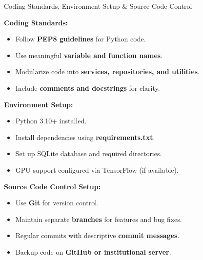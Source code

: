 \documentclass[10pt]{beamer}
\begin{document}
\begin{frame}{Coding Standards, Environment Setup \& Source Code Control}

\textbf{Coding Standards:}
\begin{itemize}
    \item Follow \textbf{PEP8 guidelines} for Python code.
    \item Use meaningful \textbf{variable and function names}.
    \item Modularize code into \textbf{services, repositories, and utilities}.
    \item Include \textbf{comments and docstrings} for clarity.
\end{itemize}

\vspace{0.3cm}

\textbf{Environment Setup:}
\begin{itemize}
    \item Python 3.10+ installed.
    \item Install dependencies using \textbf{requirements.txt}.
    \item Set up SQLite database and required directories.
    \item GPU support configured via TensorFlow (if available).
\end{itemize}

\vspace{0.3cm}

\textbf{Source Code Control Setup:}
\begin{itemize}
    \item Use \textbf{Git} for version control.
    \item Maintain separate \textbf{branches} for features and bug fixes.
    \item Regular commits with descriptive \textbf{commit messages}.
    \item Backup code on \textbf{GitHub or institutional server}.
\end{itemize}

\end{frame}
\end{document}
